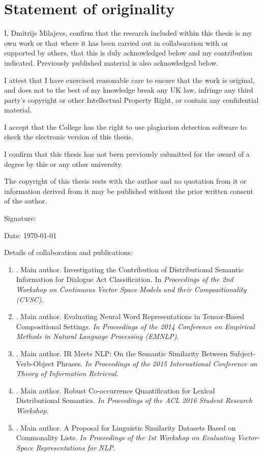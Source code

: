 \chapter*{Statement of originality}

I, Dmitrijs Milajevs, confirm that the research included within this thesis is my own work or that where it has been carried out in collaboration with or supported by others, that this is duly acknowledged below and my contribution indicated. Previously published material is also acknowledged below.

I attest that I have exercised reasonable care to ensure that the work is original, and does not to the best of my knowledge break any UK law, infringe any third party’s copyright or other Intellectual Property Right, or contain any confidential material.

I accept that the College has the right to use plagiarism detection software to check the electronic version of this thesis.

I confirm that this thesis has not been previously submitted for the award of a degree by this or any other university.

The copyright of this thesis rests with the author and no quotation from it or information derived from it may be published without the prior written consent of the author.

Signature:

Date: \today

Details of collaboration and publications:
\begin{enumerate}
\item \citet*{milajevs-purver:2014:CVSC}. Main author. Investigating the
  Contribution of Distributional Semantic Information for Dialogue Act
  Classification. In \textit{Proceedings of the 2nd Workshop on Continuous Vector Space Models and their Compositionality (CVSC)}.
\item \citet*{milajevs-EtAl:2014:EMNLP2014}. Main author. Evaluating Neural Word
  Representations in Tensor-Based Compositional Settings. \textit{In Proceedings of the 2014 Conference on Empirical Methods in Natural Language Processing (EMNLP)}.
\item \citet*{Milajevs:2015:IMN:2808194.2809448}. Main author. IR Meets NLP: On
  the Semantic Similarity Between Subject-Verb-Object Phrases. \textit{In Proceedings of the 2015 International Conference on Theory of Information Retrieval}.
\item \citet*{milajevs-sadrzadeh-purver:2016:ACL-SRW}. Main author. Robust Co-occurrence Quantification for Lexical Distributional Semantics. \textit{In Proceedings of the ACL 2016 Student Research Workshop}.
\item \citet*{milajevs-griffiths:2016:repeval}. Main author. A Proposal for Linguistic Similarity Datasets Based on Commonality Lists. \textit{In Proceedings of the 1st Workshop on Evaluating Vector-Space Representations for NLP}.
\end{enumerate}

